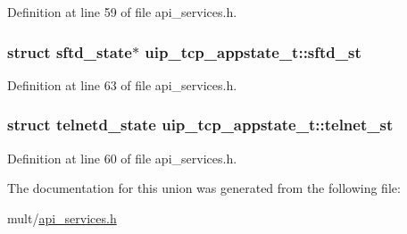 Definition at line 59 of file api\_\-services.h.

\hypertarget{unionuip__tcp__appstate__t_a5f2ba5964f99bb49f519409bd2f72722}{
\subsubsection[{sftd\_\-st}]{\setlength{\rightskip}{0pt plus 5cm}struct {\bf sftd\_\-state}$\ast$ {\bf uip\_\-tcp\_\-appstate\_\-t::sftd\_\-st}}}
\label{unionuip__tcp__appstate__t_a5f2ba5964f99bb49f519409bd2f72722}


Definition at line 63 of file api\_\-services.h.

\hypertarget{unionuip__tcp__appstate__t_af10d0b33b40d5ae1075d368defa5fc6d}{
\subsubsection[{telnet\_\-st}]{\setlength{\rightskip}{0pt plus 5cm}struct {\bf telnetd\_\-state} {\bf uip\_\-tcp\_\-appstate\_\-t::telnet\_\-st}}}
\label{unionuip__tcp__appstate__t_af10d0b33b40d5ae1075d368defa5fc6d}


Definition at line 60 of file api\_\-services.h.



The documentation for this union was generated from the following file:\begin{DoxyCompactItemize}
\item 
mult/\hyperlink{api__services_8h}{api\_\-services.h}\end{DoxyCompactItemize}
